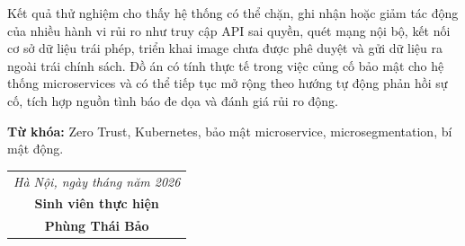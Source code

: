 Kết quả thử nghiệm cho thấy hệ thống có thể chặn, ghi nhận hoặc giảm tác động của nhiều hành vi rủi ro như truy cập API sai quyền, quét mạng nội bộ, kết nối cơ sở dữ liệu trái phép, triển khai image chưa được phê duyệt và gửi dữ liệu ra ngoài trái chính sách. Đồ án có tính thực tế trong việc củng cố bảo mật cho hệ thống microservices và có thể tiếp tục mở rộng theo hướng tự động phản hồi sự cố, tích hợp nguồn tình báo đe dọa và đánh giá rủi ro động.

\noindent\textbf{Từ khóa:} Zero Trust, Kubernetes, bảo mật microservice, microsegmentation, bí mật động.

\vspace{0.45cm}
\begin{flushright}
    \begin{tabular}{c}
        \textit{Hà Nội, ngày \hspace{0.7cm} tháng \hspace{0.7cm} năm 2026} \\[0.2cm]
        \textbf{Sinh viên thực hiện} \\[2cm]
        \textbf{Phùng Thái Bảo}
    \end{tabular}
\end{flushright}
\endgroup
